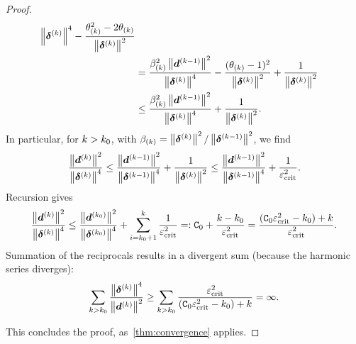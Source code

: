 \documentclass{article}
\theoremstyle{plain}
\theoremstyle{definition}
\begin{document}
\begin{proof}
\begin{align}
{		}{
			\left\|\bm{\delta}^{(k)}\right\|^4
		}
		-
		\frac{
			\theta_{(k)}^2 - 2 \theta_{(k)}
		}{
			\left\|\bm{\delta}^{(k)}\right\|^2
		}
		\nonumber
		\\
		&=
		\frac{
			\beta_{(k)}^2\left\|\bm{d}^{(k-1)}\right\|^2
		}{
			\left\|\bm{\delta}^{(k)}\right\|^4
		}
		-
		\frac{
			(\theta_{(k)} -1)^2
		}{
			\left\|\bm{\delta}^{(k)}\right\|^2
		}
		+
		\frac{1}{\left\|\bm{\delta}^{(k)}\right\|^2}
		\nonumber
		\\
		&\leq
		\frac{
			\beta_{(k)}^2\left\|\bm{d}^{(k-1)}\right\|^2
		}{
			\left\|\bm{\delta}^{(k)}\right\|^4
		}
		+
		\frac{1}{\left\|\bm{\delta}^{(k)}\right\|^2}.
		\label{eqn:recalcitratedLinearly}
	\end{align}
	In particular, for $k > k_0$, with
	$\beta_{(k)} = \left\|\bm{\delta}^{(k)}\right\|^2 / \left\|\bm{\delta}^{(k-1)}\right\|^2$,
	we find
	$$
	\frac{\left\|\bm{d}^{(k)}\right\|^2}{\left\|\bm{\delta}^{(k)}\right\|^4}
	\leq
	\frac{\left\|\bm{d}^{(k-1)}\right\|^2}{\left\|\bm{\delta}^{(k-1)}\right\|^4}
	+ \frac{1}{\left\|\bm{\delta}^{(k)}\right\|^2}
	\leq
	\frac{\left\|\bm{d}^{(k-1)}\right\|^2}{\left\|\bm{\delta}^{(k-1)}\right\|^4}
	+ \frac{1}{\varepsilon_{\mathrm{crit}}^2}.
	$$
	Recursion gives
	$$
	\frac{\left\|\bm{d}^{(k)}\right\|^2}{\left\|\bm{\delta}^{(k)}\right\|^4}
	\leq
	\frac{\left\|\bm{d}^{(k_0)}\right\|^2}{\left\|\bm{\delta}^{(k_0)}\right\|^4}
	+
	\sum_{i=k_0 + 1}^k
	\frac{1}{\varepsilon_{\mathrm{crit}}^2}
	=:
	\mathtt C_0
	+
	\frac{k - k_0}{\varepsilon_{\mathrm{crit}}^2}
	=
	\frac{(\mathtt C_0 \varepsilon_{\mathrm{crit}}^2 - k_0) + k}{\varepsilon_{\mathrm{crit}}^2}.
	$$
	Summation of the reciprocals results in a 
	divergent sum (because the harmonic series diverges):
	$$
	\sum_{k>k_0}
	\frac{\left\|\bm{\delta}^{(k)}\right\|^4}{\left\|\bm{d}^{(k)}\right\|^2}
	\geq 
	\sum_{k>k_0}
	\frac{
		\varepsilon_{\mathrm{crit}}^2
		}{
		(\mathtt C_0 \varepsilon_{\mathrm{crit}}^2 - k_0) + k
	}
	= \infty.
	$$

	This concludes the proof, as~\cref{thm:convergence} applies.
\end{proof}
\end{document}
